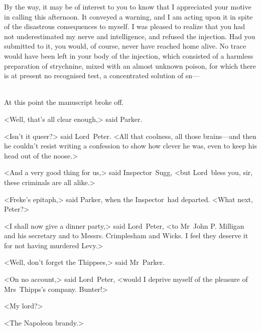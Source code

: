 By the way, it may be of interest to you to know that I appreciated your motive in calling this afternoon. It conveyed a warning, and I am acting upon it in spite of the disastrous consequences to myself. I was pleased to realize that you had not underestimated my nerve and intelligence, and refused the injection. Had you submitted to it, you would, of course, never have reached home alive. No trace would have been left in your body of the injection, which consisted of a harmless preparation of strychnine, mixed with an almost unknown poison, for which there is at present no recognised test, a concentrated solution of sn—

~\\

At this point the manuscript broke off.

<Well, that's all clear enough,> said Parker.

<Isn't it queer?> said Lord~Peter. <All that coolness, all those brains—and then he couldn't resist writing a confession to show how clever he was, even to keep his head out of the noose.>

<And a very good thing for us,> said Inspector~Sugg, <but Lord~bless you, sir, these criminals are all alike.>

<Freke's epitaph,> said Parker, when the Inspector~had departed. <What next, Peter?>

<I shall now give a dinner party,> said Lord~Peter, <to Mr~John P\@. Milligan and his secretary and to Messrs. Crimplesham and Wicks. I feel they deserve it for not having murdered Levy.>

<Well, don't forget the Thippses,> said Mr~Parker.

<On no account,> said Lord~Peter, <would I deprive myself of the pleasure of Mrs~Thipps's company. Bunter!>

<My lord?>

<The Napoleon brandy.>
